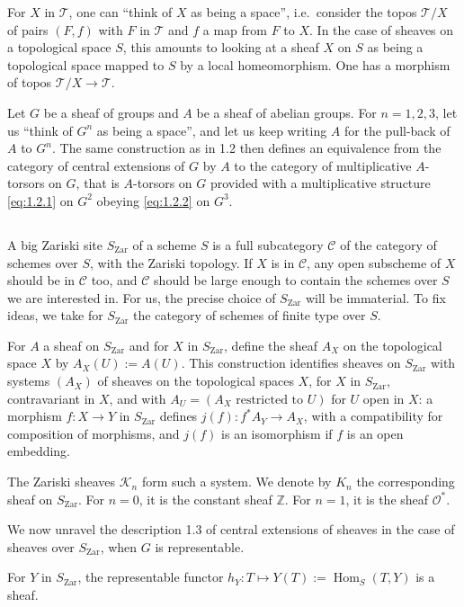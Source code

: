\documentclass[11pt,a4paper]{article}
\theoremstyle{plain}
\theoremstyle{definition}
\DeclareMathOperator{\Hom}{Hom}
\newcommand{\cC}{\mathcal{C}}
\newcommand{\cK}{\mathcal{K}}
\newcommand{\cO}{\mathcal{O}}
\newcommand{\cT}{\mathcal{T}}
\newcommand{\bZ}{\mathbb{Z}}
\newcommand{\Zar}{\mathrm{Zar}}
\begin{document}
For $X$ in $\cT$, one can ``think of $X$ as being a space'', i.e.~consider the topos $\cT/X$ of pairs $(F,f)$ with $F$ in $\cT$ and $f$ a map from $F$ to $X$. In the case of sheaves on a topological space $S$, this amounts to looking at a sheaf $X$ on $S$ as being a topological space mapped to $S$ by a local homeomorphism. One has a morphism of topos $\cT/X \to \cT$.

Let $G$ be a sheaf of groups and $A$ be a sheaf of abelian groups. For $n = 1, 2, 3$, let us ``think of $G^n$ as being a space'', and let us keep writing $A$ for the pull-back of $A$ to $G^n$. The same construction as in 1.2 then defines an equivalence from the category of central extensions of $G$ by $A$ to the category of multiplicative $A$-torsors on $G$, that is $A$-torsors on $G$ provided with a multiplicative structure \eqref{eq:1.2.1} on $G^2$ obeying \eqref{eq:1.2.2} on $G^3$.

\subsection{}
A big Zariski site $S_{\Zar}$ of a scheme $S$ is a full subcategory $\cC$ of the category of schemes over $S$, with the Zariski topology. If $X$ is in $\cC$, any open subscheme of $X$ should be in $\cC$ too, and $\cC$ should be large enough to contain the schemes over $S$ we are interested in. For us, the precise choice of $S_{\Zar}$ will be immaterial. To fix ideas, we take for $S_{\Zar}$ the category of schemes of finite type over $S$.

For $A$ a sheaf on $S_{\Zar}$ and for $X$ in $S_{\Zar}$, define the sheaf $A_X$ on the topological space $X$ by $A_X(U) := A(U)$. This construction identifies sheaves on $S_{\Zar}$ with systems $(A_X)$ of sheaves on the topological spaces $X$, for $X$ in $S_{\Zar}$, contravariant in $X$, and with $A_U = (A_X \text{ restricted to } U)$ for $U$ open in $X$: a morphism $f: X \to Y$ in $S_{\Zar}$ defines $j(f): f^*A_Y \to A_X$, with a compatibility for composition of morphisms, and $j(f)$ is an isomorphism if $f$ is an open embedding.

The Zariski sheaves $\cK_n$ form such a system. We denote by $K_n$ the corresponding sheaf on $S_{\Zar}$. For $n=0$, it is the constant sheaf $\bZ$. For $n=1$, it is the sheaf $\cO^*$.

We now unravel the description 1.3 of central extensions of sheaves in the case of sheaves over $S_{\Zar}$, when $G$ is representable.

For $Y$ in $S_{\Zar}$, the representable functor $h_Y: T \mapsto Y(T) := \Hom_S(T,Y)$ is a sheaf.
\end{document}
